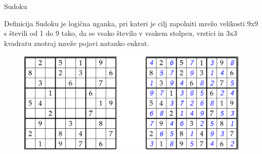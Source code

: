 \documentclass{beamer}
\begin{document}
\begin{frame}{Sudoku}

\begin{block}{Definicija}
Sudoku je logična uganka, pri kateri je cilj zapolniti mrežo velikosti 9x9 s števili od 1 do 9 tako, da se vsako število v vsakem stolpcu, vrstici in 3x3 kvadratu znotraj mreže pojavi natanko enkrat.
\end{block}

\begin{figure}
\centering
\includegraphics[scale=0.3]{sudoku_resen}
\end{figure}

\end{frame}

\end{document}
